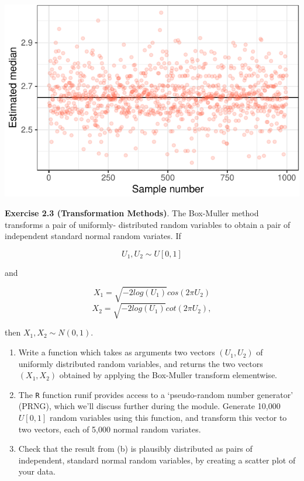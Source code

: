 \documentclass[]{article}
\begin{document}
\begin{center}\includegraphics{exercises_files/figure-latex/unnamed-chunk-4-1} \end{center}

\textbf{Exercise 2.3 (Transformation Methods)}. The Box-Muller method
transforms a pair of uniformly- distributed random variables to obtain a
pair of independent standard normal random variates. If

\[U_1, U_2 \sim U[0,1]\]

and

\[ X_1 = \sqrt{-2log(U_1)} cos(2\pi U_2)\]
\[ X_2 = \sqrt{-2log(U_1)} cot(2\pi U_2),\]

then \(X_1, X_2 \sim N(0, 1)\).

\begin{enumerate}
\def\labelenumi{(\alph{enumi})}
\item
  Write a function which takes as arguments two vectors \((U_1, U_2)\)
  of uniformly distributed random variables, and returns the two vectors
  \((X_1, X_2)\) obtained by applying the Box-Muller transform
  elementwise.
\item
  The \texttt{R} function runif provides access to a `pseudo-random
  number generator' (PRNG), which we'll discuss further during the
  module. Generate 10,000 \(U[0,1]\) random variables using this
  function, and transform this vector to two vectors, each of 5,000
  normal random variates.
\item
  Check that the result from (b) is plausibly distributed as pairs of
  independent, standard normal random variables, by creating a scatter
  plot of your data.
\end{enumerate}
\end{document}
